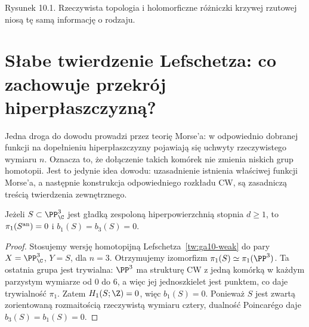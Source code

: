 \begin{center}

{\small Rysunek 10.1. Rzeczywista topologia i holomorficzne różniczki
krzywej rzutowej niosą tę samą informację o rodzaju.}\par
\end{center}

\section{Słabe twierdzenie Lefschetza: co zachowuje przekrój hiperpłaszczyzną?}
\label{sec:ga10-weak}



\begin{uwaga}
Jedna droga do dowodu prowadzi przez teorię Morse'a:
w odpowiednio dobranej funkcji na dopełnieniu hiperpłaszczyzny
pojawiają się uchwyty rzeczywistego wymiaru $n$.
Oznacza to, że dołączenie takich komórek nie zmienia
niskich grup homotopii. Jest to jedynie idea dowodu:
uzasadnienie istnienia właściwej funkcji Morse'a,
a następnie konstrukcja odpowiedniego rozkładu CW,
są zasadniczą treścią twierdzenia zewnętrznego.
\end{uwaga}

\begin{stwierdzenie}
\label{st:ga10-simplyconn}
Jeżeli $S\subset\PP^3_\C$ jest gładką zespoloną
hiperpowierzchnią stopnia $d\ge1$, to
$\pi_1(S^{\rm an})=0$ i $b_1(S)=b_3(S)=0$.
\end{stwierdzenie}
\begin{proof}
Stosujemy wersję homotopijną
Lefschetza~\ref{tw:ga10-weak} do pary
$X=\PP^3_\C$, $Y=S$, dla $n=3$.
Otrzymujemy izomorfizm $\pi_1(S)\simeq\pi_1(\PP^3)$.
Ta ostatnia grupa jest trywialna: $\PP^3$ ma strukturę
CW z jedną komórką w każdym parzystym wymiarze od $0$ do $6$,
a więc jej jednoszkielet jest punktem, co daje trywialność
$\pi_1$. Zatem $H_1(S;\Z)=0$, więc $b_1(S)=0$.
Ponieważ $S$ jest zwartą zorientowaną rozmaitością
rzeczywistą wymiaru cztery, dualność Poincarégo daje
$b_3(S)=b_1(S)=0$.
\end{proof}

